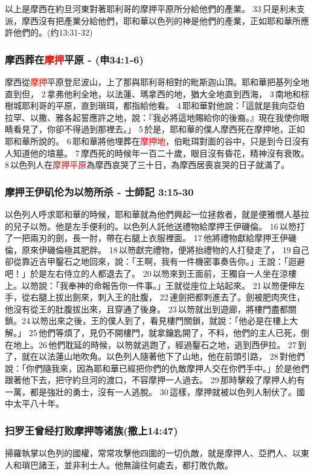 以上是摩西在約旦河東對著耶利哥的摩押平原所分給他們的產業。 33 只是利未支派，摩西沒有把產業分給他們，耶和華以色列的神是他們的產業，正如耶和華所應許他們的。(约13:31-32)

\subsubsection{摩西葬在\textcolor{red}{摩押}平原 - (申34:1-6)}
摩西從\textcolor{red}{摩押}平原登尼波山，上了那與耶利哥相對的毗斯迦山頂。耶和華把基列全地直到但， 2 拿弗他利全地，以法蓮、瑪拿西的地，猶大全地直到西海， 3 南地和棕樹城耶利哥的平原，直到瑣珥，都指給他看。 4 耶和華對他說：「這就是我向亞伯拉罕、以撒、雅各起誓應許之地，說：『我必將這地賜給你的後裔。』現在我使你眼睛看見了，你卻不得過到那裡去。」 5 於是，耶和華的僕人摩西死在摩押地，正如耶和華所說的。 6 耶和華將他埋葬在\textcolor{red}{摩押地}，伯毗珥對面的谷中，只是到今日沒有人知道他的墳墓。 7 摩西死的時候年一百二十歲，眼目沒有昏花，精神沒有衰敗。 8 以色列人在\textcolor{red}{摩押平原}為摩西哀哭了三十日，為摩西居喪哀哭的日子就滿了。



\subsubsection{摩押王伊矶伦为以笏所杀 - 士師記 3:15-30}
以色列人呼求耶和華的時候，耶和華就為他們興起一位拯救者，就是便雅憫人基拉的兒子以笏。他是左手便利的。以色列人託他送禮物給摩押王伊磯倫。 16 以笏打了一把兩刃的劍，長一肘，帶在右腿上衣服裡面。 17 他將禮物獻給摩押王伊磯倫，原來伊磯倫極其肥胖。 18 以笏獻完禮物，便將抬禮物的人打發走了， 19 自己卻從靠近吉甲鑿石之地回來，說：「王啊，我有一件機密事奏告你。」王說：「迴避吧！」於是左右侍立的人都退去了。 20 以笏來到王面前，王獨自一人坐在涼樓上。以笏說：「我奉神的命報告你一件事。」王就從座位上站起來。 21 以笏便伸左手，從右腿上拔出劍來，刺入王的肚腹， 22 連劍把都刺進去了。劍被肥肉夾住，他沒有從王的肚腹拔出來，且穿通了後身。 23 以笏就出到遊廊，將樓門盡都關鎖。24 以笏出來之後，王的僕人到了，看見樓門關鎖，就說：「他必是在樓上大解。」 25 他們等煩了，見仍不開樓門，就拿鑰匙開了，不料，他們的主人已死，倒在地上。26 他們耽延的時候，以笏就逃跑了，經過鑿石之地，逃到西伊拉。 27 到了，就在以法蓮山地吹角。以色列人隨著他下了山地，他在前頭引路， 28 對他們說：「你們隨我來，因為耶和華已經把你們的仇敵摩押人交在你們手中。」於是他們跟著他下去，把守約旦河的渡口，不容摩押一人過去。 29 那時擊殺了摩押人約有一萬，都是強壯的勇士，沒有一人逃脫。 30 這樣，摩押就被以色列人制伏了。國中太平八十年。


\subsubsection{扫罗王曾经打败摩押等诸族(撒上14:47)}
掃羅執掌以色列的國權，常常攻擊他四圍的一切仇敵，就是摩押人、亞捫人、以東人和瑣巴諸王，並非利士人。他無論往何處去，都打敗仇敵。


